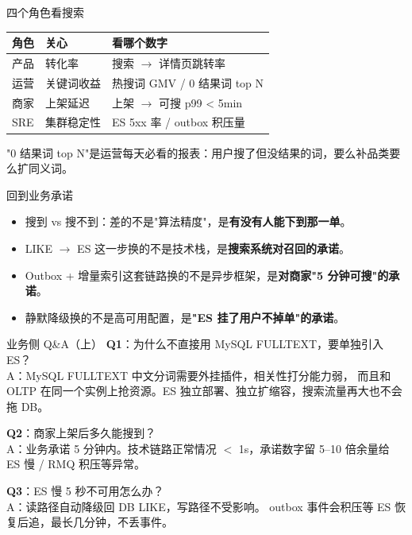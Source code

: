 \begin{frame}{四个角色看搜索}
\begin{tabular}{@{}llp{5.5cm}@{}}
\toprule
角色   & 关心        & 看哪个数字 \\
\midrule
产品   & 转化率      & 搜索 $\to$ 详情页跳转率 \\
运营   & 关键词收益  & 热搜词 GMV / 0 结果词 top N \\
商家   & 上架延迟    & 上架 $\to$ 可搜 p99 < 5min \\
SRE   & 集群稳定性  & ES 5xx 率 / outbox 积压量 \\
\bottomrule
\end{tabular}
\vspace{3mm}
\small "0 结果词 top N"是运营每天必看的报表：用户搜了但没结果的词，要么补品类要么扩同义词。
\end{frame}

\begin{frame}{回到业务承诺}
\begin{itemize}
  \item 搜到 vs 搜不到：差的不是"算法精度"，是\textbf{有没有人能下到那一单}。
  \item LIKE $\to$ ES 这一步换的不是技术栈，是\textbf{搜索系统对召回的承诺}。
  \item Outbox + 增量索引这套链路换的不是异步框架，是\textbf{对商家"5 分钟可搜"的承诺}。
  \item 静默降级换的不是高可用配置，是\textbf{"ES 挂了用户不掉单"的承诺}。
\end{itemize}
\vspace{2mm}
\end{frame}

\appendix

\begin{frame}{业务侧 Q\&A（上）}
\textbf{Q1}：为什么不直接用 MySQL FULLTEXT，要单独引入 ES？\\
\hspace{4mm}\small A：MySQL FULLTEXT 中文分词需要外挂插件，相关性打分能力弱，
而且和 OLTP 在同一个实例上抢资源。ES 独立部署、独立扩缩容，搜索流量再大也不会拖 DB。

\vspace{2mm}
\textbf{Q2}：商家上架后多久能搜到？\\
\hspace{4mm}\small A：业务承诺 5 分钟内。技术链路正常情况 $<$ 1s，承诺数字留 5--10 倍余量给 ES 慢 / RMQ 积压等异常。

\vspace{2mm}
\textbf{Q3}：ES 慢 5 秒不可用怎么办？\\
\hspace{4mm}\small A：读路径自动降级回 DB LIKE，写路径不受影响。
outbox 事件会积压等 ES 恢复后追，最长几分钟，不丢事件。
\end{frame}

